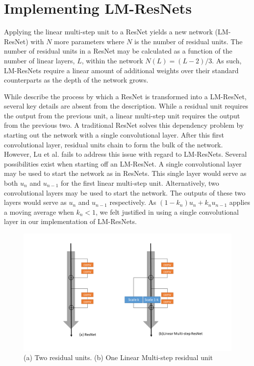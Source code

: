 \documentclass{article}
\begin{document}
\section{Implementing LM-ResNets}
Applying the linear multi-step unit to a ResNet yields a new network (LM-ResNet) with $N$ more 
parameters where $N$ is the number of residual units. The number of residual units in a ResNet
may be calculated as a function of the number of linear layers, $L$, within the network
$N(L) = (L - 2) / 3$. As such, LM-ResNets require a linear amount of additional weights over 
their standard counterparts as the depth of the network grows.

While \citet{Lu} describe the process by which a ResNet is transformed into a LM-ResNet, several key
details are absent from the description. While a residual unit requires the output from the previous unit, a linear multi-step unit requires the output from the previous two. A traditional ResNet solves this dependency problem by starting out the network with a single convolutional layer. After this first convolutional layer, residual units chain to form the bulk of the network. However, Lu et al. fails to address this issue with regard to LM-ResNets. Several possibilities exist when starting off an LM-ResNet. A single convolutional layer may be used to start the network as in ResNets. This single layer would serve as both $u_n$ and $u_{n-1}$ for the first linear multi-step unit. Alternatively, two convolutional layers may be used to start the network. The outputs of these two layers would serve as $u_n$ and $u_{n-1}$ respectively. As $(1 - k_n)u_n + k_n u_{n-1}$ applies a moving average when $k_n < 1$, we felt justified in using a single convolutional layer in our implementation of LM-ResNets.

\begin{figure}[h]
  \centering
  \includegraphics[scale=0.25]{Lu/units.png}
  \caption{(a) Two residual units. (b) One Linear Multi-step residual unit}
\end{figure}
\end{document}
